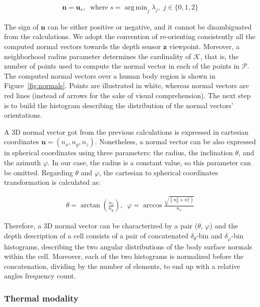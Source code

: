 \documentclass[10pt,twocolumn,letterpaper]{article}
\DeclareMathOperator*{\argmin}{arg\,min}
\begin{document}
\begin{gather}
	\mathbf{n} = \mathbf{u}_s, \;\; \mathrm{where}\;  s = \argmin_{j}{\lambda_j},\; j \in \{0,1,2\}
\end{gather}

The sign of $\mathbf{n}$ can be either positive or negative, and it cannot be disambiguated from the calculations. We adopt the convention of re-orienting consistently all the computed normal vectors towards the depth sensor $\mathbf{z}$ viewpoint. Moreover, a neighborhood radius parameter determines the cardinality of $\mathcal{K}$, that is, the number of points used to compute the normal vector in each of the points in $\mathcal{P}$. The computed normal vectors over a human body region is shown in Figure~\ref{fig:normals}. Points are illustrated in white, whereas normal vectors are red lines (instead of arrows for the sake of visual comprehension). The next step is to build the histogram describing the distribution of the normal vectors' orientations.

A 3D normal vector got from the previous calculations is expressed in cartesian coordinates $\mathbf{n} = (n_x, n_y, n_z)$. Nonetheless, a normal vector can be also expressed in spherical coordinates using three parameters: the radius, the inclination $\theta$, and the azimuth $\varphi$. In our case, the radius is a constant value, so this parameter can be omitted. Regarding $\theta$ and $\varphi$, the cartesian to spherical coordinates transformation is calculated as:

\begin{gather}	
	\theta  = \arctan{\left( \frac{n_z}{n_y} \right)},\;\;
	\varphi = \arccos{\frac{ \sqrt{(n_y^2 + n_z^2)} }{n_x}}
\end{gather}

Therefore, a 3D normal vector can be characterized by a pair ($\theta$, $\varphi$) and the depth description of a cell consists of a pair of concatenated $\delta_\theta$-bin and $\delta_\varphi$-bin histograms, describing the two angular distributions of the body surface normals within the cell. Moreover, each of the two histograms is normalized before the concatenation, dividing by the number of elements, to end up with a relative angles frequency count.

\subsubsection{Thermal modality}
\label{sssec:thermal}
\end{document}
